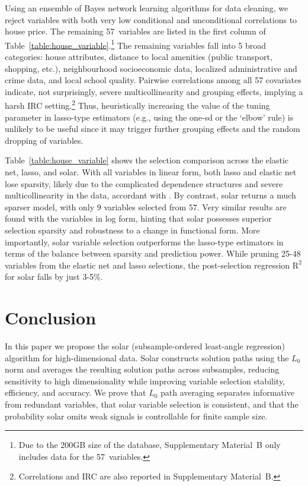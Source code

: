 \documentclass[11pt,review,authoryear]{elsarticle}
\begin{document}
Using an ensemble of Bayes network learning algorithms for data cleaning, we reject variables with both very low conditional and unconditional correlations to house price. The remaining 57~variables are listed in the first column of Table~\ref{table:house_variable}.\footnote{Due to the 200GB size of the database, Supplementary Material~B only includes data for the 57~variables.} The remaining variables fall into 5 broad categories: house attributes, distance to local amenities (public transport, shopping, etc.), neighbourhood socioeconomic data, localized administrative and crime data, and local school quality. Pairwise correlations among all 57 covariates indicate, not surprisingly, severe multicollinearity and grouping effects, implying a harsh IRC setting.\footnote{Correlations and IRC are also reported in Supplementary Material~B.} Thus, heuristically increasing the value of the tuning parameter in lasso-type estimators (e.g., using the one-sd or the `elbow' rule) is unlikely to be useful since it may trigger further grouping effects and the random dropping of variables.

Table~\ref{table:house_variable} shows the selection comparison across the elastic net, lasso, and solar. With all variables in linear form, both lasso and elastic net lose sparsity, likely due to the complicated dependence structures and severe multicollinearity in the data, accordant with \citet{jia2010model}. By contrast, solar returns a much sparser model, with only $9$ variables selected from $57$. Very similar results are found with the variables in log form, hinting that solar possesses superior selection sparsity and robustness to a change in functional form. More importantly, solar variable selection outperforms the lasso-type estimators in terms of the balance between sparsity and prediction power. While pruning 25-48 variables from the elastic net and lasso selections, the post-selection regression $\mathrm{R}^2$ for solar falls by just 3-5\%.


\section{Conclusion}

In this paper we propose the solar (subsample-ordered least-angle regression) algorithm for high-dimensional data. Solar constructs solution paths using the $L_0$ norm and averages the resulting solution paths across subsamples, reducing sensitivity to high dimensionality while improving variable selection stability, efficiency, and accuracy. We prove that $L_0$ path averaging separates informative from redundant variables, that solar variable selection is consistent, and that the probability solar omits weak signals is controllable for finite sample size.
\end{document}

